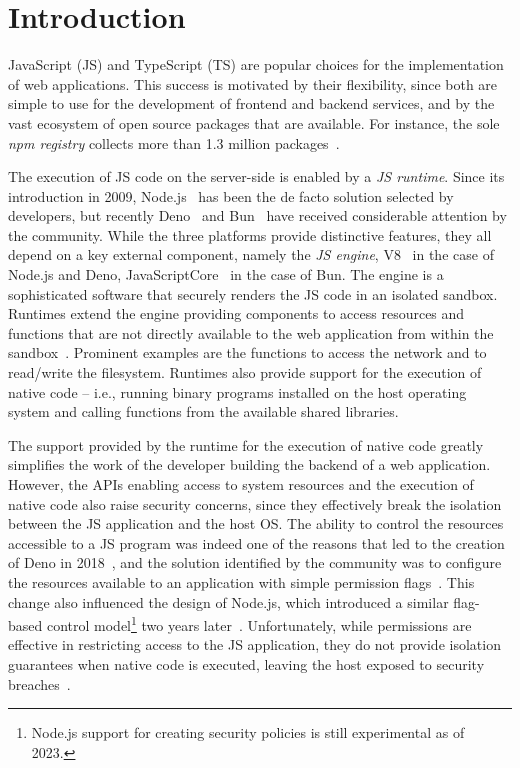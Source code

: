 \section{Introduction}
\label{sect:introduction}

JavaScript (JS) and TypeScript (TS) are popular choices for the
implementation of web applications. This success is motivated by their
flexibility, since both are simple to use for the development of
frontend and backend services, and by the vast ecosystem of open
source packages that are available. For instance, the sole {\em npm
  registry} collects more than 1.3 million
packages~\cite{npm-registry}.

The execution of JS code on the server-side is enabled by a {\em JS
  runtime}.  Since its introduction in 2009, Node.js~\cite{node} has
been the de facto solution selected by developers, but recently
Deno~\cite{deno} and Bun~\cite{bun} have received considerable
attention by the community. While the three platforms provide
distinctive features, they all depend on a key external component,
namely the {\em JS engine}, V8~\cite{v8-site} in the
case of Node.js and Deno, JavaScriptCore~\cite{javascriptcore} in the
case of Bun. The engine is a sophisticated software that securely
renders the JS code in an isolated sandbox. Runtimes extend the engine
providing components to access resources and functions that are not
directly available to the web application from within the
sandbox~\cite{node-api, deno-api}. Prominent examples are the
functions to access the network and to read/write the
filesystem. Runtimes also provide support for the execution of native
code -- i.e., running binary programs installed on the host operating
system and calling functions from the available shared libraries.

The support provided by the runtime for the execution of native code
greatly simplifies the work of the developer building the backend of a
web application. However, the APIs enabling access to system resources
and the execution of native code also raise security concerns, since
they effectively break the isolation between the JS application and
the host OS. The ability to control the resources accessible to a JS
program was indeed one of the reasons that led to the creation of Deno
in 2018~\cite{nodejs-regret}, and the solution identified by the
community was to configure the resources available to an application
with simple permission flags~\cite{deno-permissions}. This change also
influenced the design of Node.js, which introduced a similar
flag-based control model\footnote{Node.js support for creating
  security policies is still experimental as of 2023.} two years
later~\cite{node-permissions}. Unfortunately, while permissions are
effective in restricting access to the JS application, they do not
provide isolation guarantees when native code is
executed,
leaving the host exposed to security breaches~\cite{deno-permissions}.

